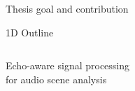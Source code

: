 \begin{frame}[t]{Thesis goal and contribution}
\end{frame}

\begin{frame}[standout]{1D Outline}
    \begin{columns}
        \begin{column}{0.35\textwidth}
            Echo-aware signal processing
            \\for audio scene analysis
        \end{column}
        \begin{column}{0.05\textwidth}
        \end{column}
        \begin{column}{0.6\textwidth}
            {
                \tableofcontents
            }
        \end{column}
    \end{columns}
\end{frame}